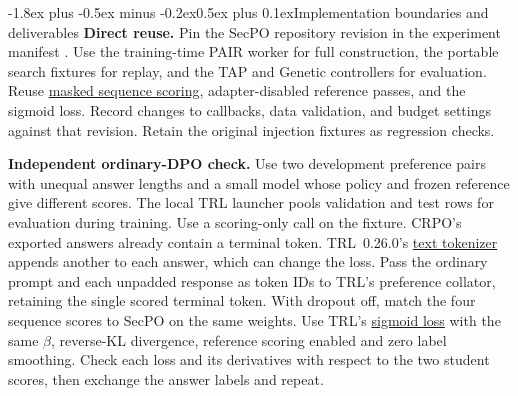 \documentclass[11pt]{article}
\makeatletter
\renewcommand\subsection{\@startsection{subsection}{2}{\z@}%
  {-1.8ex plus -0.5ex minus -0.2ex}{0.5ex plus 0.1ex}{\normalfont\large\bfseries}}
\makeatother
\begin{document}
\subsection{Implementation boundaries and deliverables}
\textbf{Direct reuse.} Pin the SecPO repository revision in the experiment manifest \cite{secpocode}. Use the training-time PAIR worker for full construction, the portable search fixtures for replay, and the TAP and Genetic controllers for evaluation. Reuse \href{https://github.com/Sizhe-Chen/SecPO/blob/da0372a0e598badf4e51c98c175a962147cac2ac/src/secpo/loss.py}{masked sequence scoring}, adapter-disabled reference passes, and the sigmoid loss. Record changes to callbacks, data validation, and budget settings against that revision. Retain the original injection fixtures as regression checks.

\textbf{Independent ordinary-DPO check.} Use two development preference pairs with unequal answer lengths and a small model whose policy and frozen reference give different scores. The local TRL launcher pools validation and test rows for evaluation during training. Use a scoring-only call on the fixture. CRPO's exported answers already contain a terminal token. TRL~0.26.0's \href{https://github.com/huggingface/trl/blob/84794a7d03c748f3e1518cd3efc9a944b8cdd2bd/trl/trainer/dpo_trainer.py#L670-L735}{text tokenizer} appends another to each answer, which can change the loss. Pass the ordinary prompt and each unpadded response as token IDs to TRL's preference collator, retaining the single scored terminal token. With dropout off, match the four sequence scores to SecPO on the same weights. Use TRL's \href{https://github.com/huggingface/trl/blob/84794a7d03c748f3e1518cd3efc9a944b8cdd2bd/trl/trainer/dpo_trainer.py#L1008-L1102}{sigmoid loss} with the same $\beta$, reverse-KL divergence, reference scoring enabled and zero label smoothing. Check each loss and its derivatives with respect to the two student scores, then exchange the answer labels and repeat.
\end{document}
